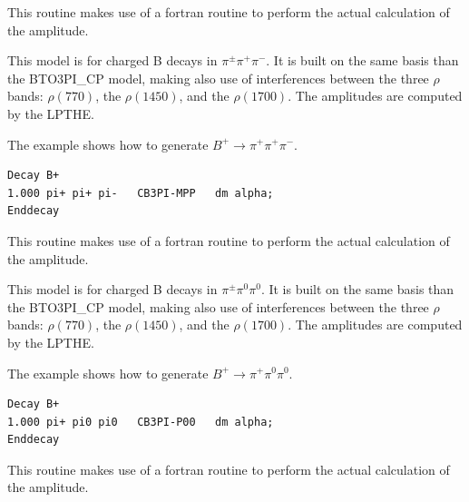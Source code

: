 \Notes
This routine makes use of a fortran routine to perform the 
actual calculation of the amplitude.



\label{cbto3pimpp}



\Expl
This model is for charged B decays in $\pi^{\pm}\pi^+\pi^-$.
It is built on the same basis than the BTO3PI\_CP model, making also use of interferences between the three $\rho$ bands: $\rho(770)$, the $\rho(1450)$, and the $\rho(1700)$. The amplitudes are computed by the LPTHE.

\Example

\noindent The example shows how to generate $B^+ \rightarrow \pi^+\pi^+\pi^-$.
\begin{verbatim}
Decay B+
1.000 pi+ pi+ pi-   CB3PI-MPP   dm alpha;
Enddecay
\end{verbatim}

\Notes
This routine makes use of a fortran routine to perform the 
actual calculation of the amplitude.



\label{cbto3pip00}



\Expl
This model is for charged B decays in $\pi^{\pm}\pi^0\pi^0$.
It is built on the same basis than the BTO3PI\_CP model, making also use of interferences between the three $\rho$ bands: $\rho(770)$, the $\rho(1450)$, and the $\rho(1700)$. The amplitudes are computed by the LPTHE.

\Example

\noindent The example shows how to generate $B^+ \rightarrow \pi^+\pi^0\pi^0$.
\begin{verbatim}
Decay B+
1.000 pi+ pi0 pi0   CB3PI-P00   dm alpha;
Enddecay
\end{verbatim}

\Notes
This routine makes use of a fortran routine to perform the 
actual calculation of the amplitude.


\label{btoKpipicp}



